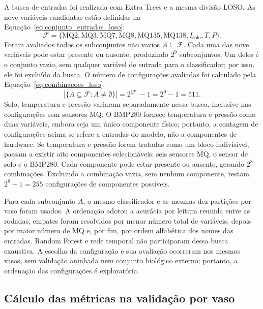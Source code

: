 A busca de entradas foi realizada com Extra Trees e a mesma divisão LOSO.
As nove variáveis candidatas estão definidas na
Equação~\eqref{eq:conjunto_entradas_loso}:
\begin{equation}
    \mathcal{F}=\{\mathrm{MQ2},\mathrm{MQ3},\mathrm{MQ7},\mathrm{MQ8},
    \mathrm{MQ135},\mathrm{MQ138},I_{\mathrm{solo}},T,P\}.
    \label{eq:conjunto_entradas_loso}
\end{equation}
Foram avaliados todos os subconjuntos não vazios $A\subseteq\mathcal{F}$.
Cada uma das nove variáveis pode estar presente ou ausente, produzindo
$2^9$ subconjuntos. Um deles é o conjunto vazio, sem qualquer variável
de entrada para o classificador; por isso, ele foi excluído da busca.
O número de configurações avaliadas foi calculado pela
Equação~\eqref{eq:combinacoes_loso}:
\begin{equation}
    \left|\{A\subseteq\mathcal{F}:A\neq\emptyset\}\right|
    =2^{|\mathcal{F}|}-1=2^9-1=511.
    \label{eq:combinacoes_loso}
\end{equation}
Solo, temperatura e pressão variaram separadamente nessa busca,
inclusive nas configurações sem sensores MQ. O BMP280 fornece
temperatura e pressão como duas variáveis, embora seja um único componente
físico; portanto, a contagem de configurações acima se refere a entradas
do modelo, não a componentes de hardware. Se temperatura e pressão forem
tratadas como um bloco indivisível, passam a existir oito componentes
selecionáveis: seis sensores MQ, o sensor de solo e o BMP280. Cada
componente pode estar presente ou ausente, gerando $2^8$ combinações.
Excluindo a combinação vazia, sem nenhum componente, restam
$2^8-1=255$ configurações de componentes possíveis.

Para cada subconjunto $A$, o mesmo classificador e as mesmas dez partições
por vaso foram usados. A ordenação adotou a acurácia por leitura reunida
entre as rodadas; empates foram resolvidos por menor número total de
variáveis, depois por maior número de MQ e, por fim, por ordem alfabética
dos nomes das entradas. Random Forest e rede temporal não participaram
dessa busca exaustiva. A escolha da configuração e sua avaliação ocorreram
nos mesmos vasos, sem validação aninhada nem conjunto biológico externo;
portanto, a ordenação das configurações é exploratória.

\subsection{Cálculo das métricas na validação por vaso}
\label{subsec:metricas_loso_complementar}

